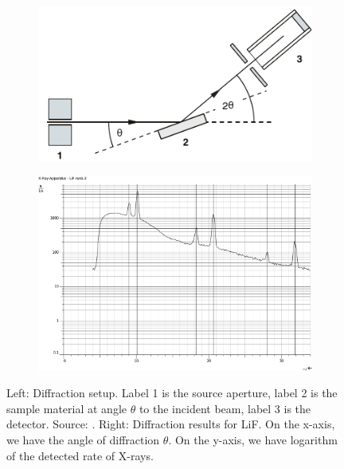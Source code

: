 \documentclass[11pt,a4paper,twoside,onecolumn]{article}
\begin{document}
\begin{figure}[!htbp]
    \hfill
    \begin{subfigure}[t]{0.4\textwidth}
        \centering
        \includegraphics[width=\textwidth]{img/diffraction-setup.pdf}
    \end{subfigure}
    \hfill
    \begin{subfigure}[t]{0.56\textwidth}
        \centering
        \includegraphics[width=\textwidth]{img/diffraction-LiF.pdf}
    \end{subfigure}
    \hfill
    \caption{Left: Diffraction setup. Label 1 is the source aperture, label 2 is the sample material at angle $\theta$ to the incident beam, label 3 is the detector. Source: \cite{OxfPhys2010}. Right: Diffraction results for LiF. On the x-axis, we have the angle of diffraction $\theta$. On the y-axis, we have logarithm of the detected rate of X-rays.}
    \label{fig:diffraction-setup}
\end{figure}
\end{document}
